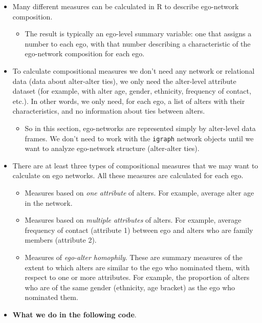 \documentclass[
]{book}
\providecommand{\tightlist}{%
  \setlength{\itemsep}{0pt}\setlength{\parskip}{0pt}}
\begin{document}
\begin{itemize}
\tightlist
\item
  Many different measures can be calculated in R to describe ego-network composition.

  \begin{itemize}
  \tightlist
  \item
    The result is typically an ego-level summary variable: one that assigns a number to each ego, with that number describing a characteristic of the ego-network composition for each ego.
  \end{itemize}
\item
  To calculate compositional measures we don't need any network or relational data (data about alter-alter ties), we only need the alter-level attribute dataset (for example, with alter age, gender, ethnicity, frequency of contact, etc.). In other words, we only need, for each ego, a list of alters with their characteristics, and no information about ties between alters.

  \begin{itemize}
  \tightlist
  \item
    So in this section, ego-networks are represented simply by alter-level data frames. We don't need to work with the \texttt{igraph} network objects until we want to analyze ego-network structure (alter-alter ties).
  \end{itemize}
\item
  There are at least three types of compositional measures that we may want to calculate on ego networks. All these measures are calculated for each ego.

  \begin{itemize}
  \tightlist
  \item
    Measures based on \emph{one attribute} of alters. For example, average alter age in the network.
  \item
    Measures based on \emph{multiple attributes} of alters. For example, average frequency of contact (attribute 1) between ego and alters who are family members (attribute 2).
  \item
    Measures of \emph{ego-alter homophily}. These are summary measures of the extent to which alters are similar to the ego who nominated them, with respect to one or more attributes. For example, the proportion of alters who are of the same gender (ethnicity, age bracket) as the ego who nominated them.
  \end{itemize}
\item
  \textbf{What we do in the following code}.


\end{itemize}
\end{document}

